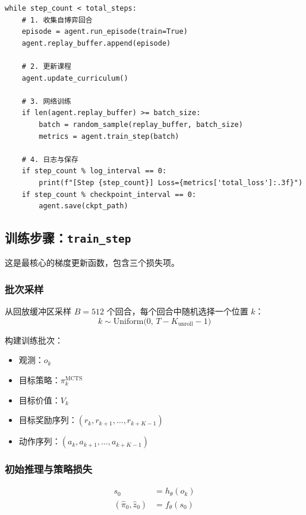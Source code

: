 \documentclass[UTF8, a4paper]{ctexart}
\begin{document}
\begin{lstlisting}
while step_count < total_steps:
    # 1. 收集自博弈回合
    episode = agent.run_episode(train=True)
    agent.replay_buffer.append(episode)
    
    # 2. 更新课程
    agent.update_curriculum()
    
    # 3. 网络训练
    if len(agent.replay_buffer) >= batch_size:
        batch = random_sample(replay_buffer, batch_size)
        metrics = agent.train_step(batch)
    
    # 4. 日志与保存
    if step_count % log_interval == 0:
        print(f"[Step {step_count}] Loss={metrics['total_loss']:.3f}")
    if step_count % checkpoint_interval == 0:
        agent.save(ckpt_path)
\end{lstlisting}

\subsection{训练步骤：\texttt{train\_step}}

这是最核心的梯度更新函数，包含三个损失项。

\subsubsection{批次采样}

从回放缓冲区采样 $B = 512$ 个回合，每个回合中随机选择一个位置 $k$：
\begin{equation}
k \sim \text{Uniform}\big(0, \, T - K_{\text{unroll}} - 1\big)
\end{equation}

构建训练批次：
\begin{itemize}[leftmargin=2em]
    \item 观测：$o_k$
    \item 目标策略：$\pi_k^{\text{MCTS}}$
    \item 目标价值：$V_k$
    \item 目标奖励序列：$(r_k, r_{k+1}, \dots, r_{k+K-1})$
    \item 动作序列：$(a_k, a_{k+1}, \dots, a_{k+K-1})$
\end{itemize}

\subsubsection{初始推理与策略损失}

\begin{align}
s_0 &= h_\theta(o_k) \\
(\hat{\pi}_0, \hat{z}_0) &= f_\theta(s_0)
\end{align}
\end{document}

